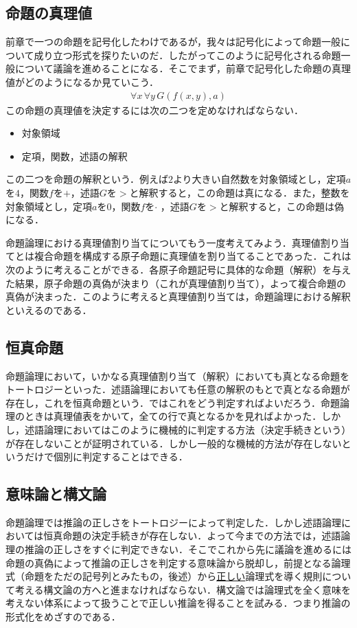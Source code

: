 \documentclass[10pt,b5paper,papersize,dvipdfmx]{jsbook}
\newcommand\fal[1]{\forall#1\,}
\begin{document}
\subsection{命題の真理値}
前章で一つの命題を記号化したわけであるが，我々は記号化によって命題一般について成り立つ形式を探りたいのだ．したがってこのように記号化される命題一般について議論を進めることになる．そこでまず，前章で記号化した命題の真理値がどのようになるか見ていこう．
\begin{align*}
  \fal{x} \fal{y} G(f(x,y),a)
\end{align*}
この命題の真理値を決定するには次の二つを定めなければならない．
\begin{itemize}
  \item 対象領域
  \item 定項，関数，述語の解釈
\end{itemize}
この二つを命題の解釈という．例えば$2$より大きい自然数を対象領域とし，定項$a$を$4$，関数$f$を$+$，述語$G$を$>$と解釈すると，この命題は真になる．また，整数を対象領域とし，定項$a$を$0$，関数$f$を$\cdot$\,\,，述語$G$を$>$と解釈すると，この命題は偽になる． \par
命題論理における真理値割り当てについてもう一度考えてみよう．真理値割り当てとは複合命題を構成する原子命題に真理値を割り当てることであった．これは次のように考えることができる．各原子命題記号に具体的な命題（解釈）を与えた結果，原子命題の真偽が決まり（これが真理値割り当て），よって複合命題の真偽が決まった．このように考えると真理値割り当ては，命題論理における解釈といえるのである．

\subsection{恒真命題}
命題論理において，いかなる真理値割り当て（解釈）においても真となる命題をトートロジーといった．述語論理においても任意の解釈のもとで真となる命題が存在し，これを恒真命題という．ではこれをどう判定すればよいだろう．命題論理のときは真理値表をかいて，全ての行で真となるかを見ればよかった．しかし，述語論理においてはこのように機械的に判定する方法（決定手続きという）が存在しないことが証明されている．しかし一般的な機械的方法が存在しないというだけで個別に判定することはできる．

\subsection{意味論と構文論}
命題論理では推論の正しさをトートロジーによって判定した．しかし述語論理においては恒真命題の決定手続きが存在しない．よって今までの方法では，述語論理の推論の正しさをすぐに判定できない．そこでこれから先に議論を進めるには命題の真偽によって推論の正しさを判定する意味論から脱却し，前提となる論理式（命題をただの記号列とみたもの，後述）から\underline{正しい}論理式を導く規則について考える構文論の方へと進まなければならない．構文論では論理式を全く意味を考えない体系によって扱うことで正しい推論を得ることを試みる．つまり推論の形式化をめざすのである．
\end{document}
